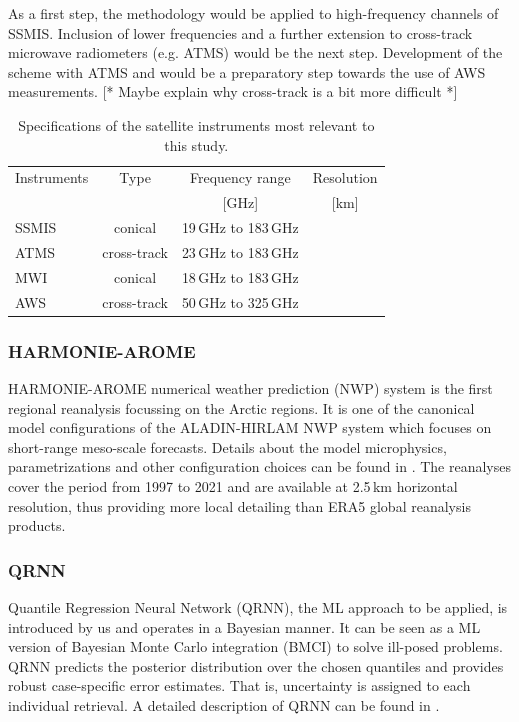 \documentclass[12pt,oneside,a4paper]{article}
\newcommand\intodo[1]{{\color{red} [* #1 *]}}
\begin{document}
As a first step, the methodology would be applied to high-frequency channels of
SSMIS. Inclusion of lower frequencies and a further extension to cross-track
microwave radiometers (e.g. ATMS) would be the next step. Development of the
scheme with ATMS and would be a preparatory step towards the use of AWS
measurements. \intodo{Maybe explain why cross-track is a bit more difficult}

\begin{table}[t]
	\centering
	\caption{Specifications of the satellite instruments most relevant to this
      study.}
	\label{tab:specifications_instruments}	
	\begin{tabular}{lccc}

		Instruments &Type& Frequency range 	& Resolution  \\
					&     & 	[GHz]				& [km]			\\
		\hline			
		SSMIS		&conical	&19\,GHz to 183\,GHz& \\
		ATMS        &cross-track&23\,GHz to 183\,GHz &\\
		\hline
		MWI         &conical     &18\,GHz to 183\,GHz&\\
		AWS         &cross-track &50\,GHz to 325\,GHz&\\ 
		
		\hline			

	\end{tabular}
\end{table}

\subsubsection{HARMONIE-AROME}
%
\label{sec:harmonie}
HARMONIE-AROME numerical weather prediction (NWP) system is the first regional reanalysis focussing on the Arctic regions. It is one of the canonical model configurations of the ALADIN-HIRLAM NWP system which focuses on short-range meso-scale forecasts. Details about the model microphysics, parametrizations and other configuration choices can be found in \citet{bengtsson:2017:harmo}. The reanalyses cover the period from 1997 to 2021 and are available at 2.5\,km horizontal resolution, thus providing more local detailing than ERA5 global reanalysis products.  
 
\subsubsection{QRNN}
%
\label{sec:qrnn}

Quantile Regression Neural Network (QRNN), the ML approach to be applied, is introduced by us and operates in a Bayesian manner. It can be seen as a ML version of Bayesian Monte Carlo integration (BMCI) to solve ill-posed problems. QRNN predicts the posterior distribution over the chosen quantiles and provides robust case-specific error estimates. That is, uncertainty is assigned to each individual retrieval. A detailed description of QRNN can be found in \citet{pfreundschuh:aneur:18}. 
\end{document}
